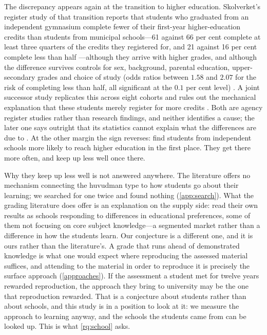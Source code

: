 The discrepancy appears again at the transition to higher education.
Skolverket's register study of that transition reports that students who
graduated from an independent gymnasium complete fewer of their first-year
higher-education credits than students from municipal schools---61 against
66 per cent complete at least three quarters of the credits they
registered for, and 21 against 16 per cent complete less than half
\autocite[p.~30]{Skolverket2018Hogskola}---although they arrive with
higher grades, and although the difference survives controls for sex,
background, parental education, upper-secondary grades and choice of study
(odds ratios between \(1.58\) and \(2.07\) for the risk of completing less
than half, all significant at the \(0.1\) per cent level)
\autocite[p.~39]{Skolverket2018Hogskola}.
A joint successor study replicates this across eight cohorts and rules out
the mechanical explanation that these students merely register for more
credits \autocite[pp.~36--37]{UKASkolverket2024}.
Both are agency register studies rather than research findings, and
neither identifies a cause; the later one says outright that its
statistics cannot explain what the differences are due to
\autocite[p.~47]{UKASkolverket2024}.
At the other margin the sign reverses:
\textcite{EdmarkPersson2021} find students from independent schools more
likely to reach higher education in the first place.
They get there more often, and keep up less well once there.

Why they keep up less well is not answered anywhere.
The literature offers no mechanism connecting the huvudman type to how
students go about their learning; we searched for one twice and found
nothing (\cref{app:search}).
What the grading literature does offer is an explanation on the supply
side: \textcite[pp.~40--41]{HinnerichVlachos2017} read their own results
as schools responding to differences in educational preferences, some of
them not focusing on core subject knowledge---a segmented market rather
than a difference in how the students learn.
Our conjecture is a different one, and it is ours rather than the
literature's.
A grade that runs ahead of demonstrated knowledge is what one would expect
where reproducing the assessed material suffices, and attending to the
material in order to reproduce it is precisely the surface approach
(\cref{approaches}).
If the assessment a student met for twelve years rewarded reproduction,
the approach they bring to university may be the one that reproduction
rewarded.
That is a conjecture about students rather than about schools, and this
study is in a position to look at it: we measure the approach to learning
anyway, and the schools the students came from can be looked up.
This is what \cref{rq:school} asks.

